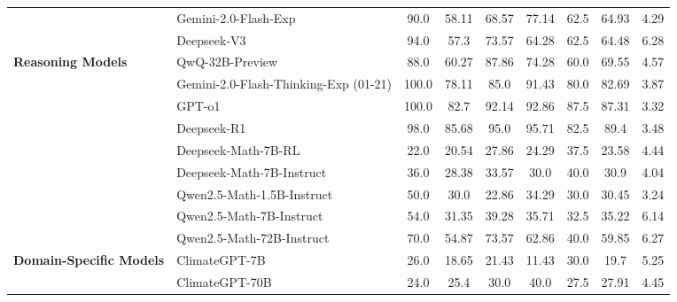 \begin{table*}[ht]
\begin{adjustbox}{max width=\textwidth}
\begin{tabular}{l l c c c c c | c c}
        & Gemini-2.0-Flash-Exp & 90.0 & 58.11 & 68.57 & 77.14 & 62.5 & 64.93 & 4.29 \\
        & \cellcolor{skyblue}Deepseek-V3 & \cellcolor{skyblue}94.0 & \cellcolor{skyblue}57.3 & \cellcolor{skyblue}73.57 & \cellcolor{skyblue}64.28 & \cellcolor{skyblue}62.5 & \cellcolor{skyblue}64.48 & \cellcolor{skyblue}6.28 \\
        \midrule
        \multirow{5}{*}{\textbf{Reasoning Models}} 
        & QwQ-32B-Preview & 88.0 & 60.27 & 87.86 & 74.28 & 60.0 & 69.55 & 4.57 \\
        & \cellcolor{skyblue}Gemini-2.0-Flash-Thinking-Exp (01-21) & \cellcolor{skyblue}100.0 & \cellcolor{skyblue}78.11 & \cellcolor{skyblue}85.0 & \cellcolor{skyblue}91.43 & \cellcolor{skyblue}80.0 & \cellcolor{skyblue}82.69 & \cellcolor{skyblue}3.87 \\
        & GPT-o1 & 100.0 & 82.7 & 92.14 & 92.86 & 87.5 & 87.31 & 3.32 \\
        & \cellcolor{skyblue}Deepseek-R1 & \cellcolor{skyblue}98.0 & \cellcolor{skyblue}85.68 & \cellcolor{skyblue}95.0 & \cellcolor{skyblue}95.71 & \cellcolor{skyblue}82.5 & \cellcolor{skyblue}89.4 & \cellcolor{skyblue}3.48 \\
        \midrule
        \multirow{5}{*}{\textbf{Math Models}} 
        & Deepseek-Math-7B-RL & 22.0 & 20.54 & 27.86 & 24.29 & 37.5 & 23.58 & 4.44 \\
        & \cellcolor{skyblue}Deepseek-Math-7B-Instruct & \cellcolor{skyblue}36.0 & \cellcolor{skyblue}28.38 & \cellcolor{skyblue}33.57 & \cellcolor{skyblue}30.0 & \cellcolor{skyblue}40.0 & \cellcolor{skyblue}30.9 & \cellcolor{skyblue}4.04 \\
        & Qwen2.5-Math-1.5B-Instruct & 50.0 & 30.0 & 22.86 & 34.29 & 30.0 & 30.45 & 3.24 \\
        & \cellcolor{skyblue}Qwen2.5-Math-7B-Instruct & \cellcolor{skyblue}54.0 & \cellcolor{skyblue}31.35 & \cellcolor{skyblue}39.28 & \cellcolor{skyblue}35.71 & \cellcolor{skyblue}32.5 & \cellcolor{skyblue}35.22 & \cellcolor{skyblue}6.14 \\
        & Qwen2.5-Math-72B-Instruct & 70.0 & 54.87 & 73.57 & 62.86 & 40.0 & 59.85 & 6.27 \\
        \midrule
        \multirow{2}{*}{\textbf{Domain-Specific Models}} 
        & \cellcolor{skyblue}ClimateGPT-7B & \cellcolor{skyblue}26.0 & \cellcolor{skyblue}18.65 & \cellcolor{skyblue}21.43 & \cellcolor{skyblue}11.43 & \cellcolor{skyblue}30.0 & \cellcolor{skyblue}19.7 & \cellcolor{skyblue}5.25 \\
        & ClimateGPT-70B & 24.0 & 25.4 & 30.0 & 40.0 & 27.5 & 27.91 & 4.45 \\
        \bottomrule
    \end{tabular}
    \end{adjustbox}
\end{table*}


